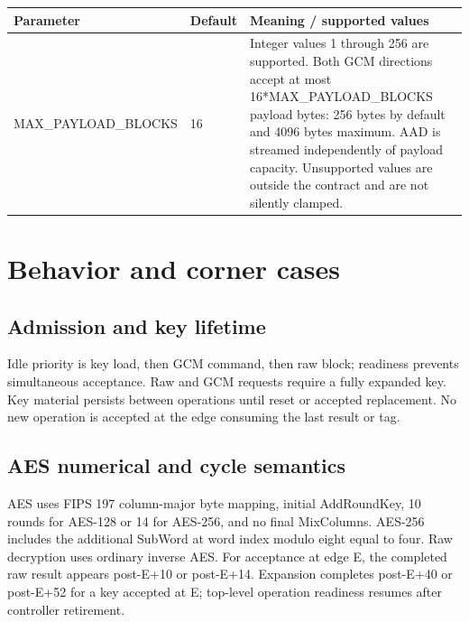 \documentclass[11pt,a4paper]{article}
\begin{document}
{\small\renewcommand{\arraystretch}{1.18}\begin{longtable}{@{}L{0.22\textwidth}|L{0.21\textwidth}|L{0.49\textwidth}@{}}\toprule

\textbf{Parameter} & \textbf{Default} & \textbf{Meaning /\allowbreak{} supported values}\\\midrule\endhead

MAX\_\allowbreak{}PAYLOAD\_\allowbreak{}BLOCKS & 16 & Integer values 1 through 256 are supported. Both GCM directions accept at most 16*\allowbreak{}MAX\_\allowbreak{}PAYLOAD\_\allowbreak{}BLOCKS payload bytes: 256 bytes by default and 4096 bytes maximum. AAD is streamed independently of payload capacity. Unsupported values are outside the contract and are not silently clamped.\\[2pt]\hline

\bottomrule\end{longtable}}

\section{Behavior and corner cases}

\subsection{Admission and key lifetime}

Idle priority is key load,\allowbreak{} then GCM command,\allowbreak{} then raw block; readiness prevents simultaneous acceptance. Raw and GCM requests require a fully expanded key. Key material persists between operations until reset or accepted replacement. No new operation is accepted at the edge consuming the last result or tag.

\subsection{AES numerical and cycle semantics}

AES uses FIPS 197 column-major byte mapping,\allowbreak{} initial AddRoundKey,\allowbreak{} 10 rounds for AES-128 or 14 for AES-256,\allowbreak{} and no final MixColumns. AES-256 includes the additional SubWord at word index modulo eight equal to four. Raw decryption uses ordinary inverse AES. For acceptance at edge E,\allowbreak{} the completed raw result appears post-E+\allowbreak{}10 or post-E+\allowbreak{}14. Expansion completes post-E+\allowbreak{}40 or post-E+\allowbreak{}52 for a key accepted at E; top-level operation readiness resumes after controller retirement.
\end{document}
